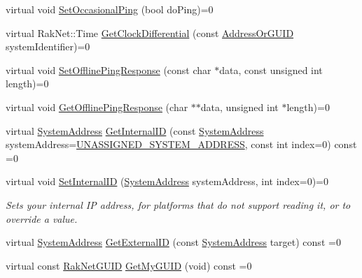 \begin{DoxyCompactItemize}
\item 
virtual void \hyperlink{class_rak_net_1_1_rak_peer_interface_afdc6e658512d2f01d6bb211758721f21}{Set\-Occasional\-Ping} (bool do\-Ping)=0
\item 
virtual Rak\-Net\-::\-Time \hyperlink{class_rak_net_1_1_rak_peer_interface_a7fa284803461a09efeffd65d73068c51}{Get\-Clock\-Differential} (const \hyperlink{struct_rak_net_1_1_address_or_g_u_i_d}{Address\-Or\-G\-U\-I\-D} system\-Identifier)=0
\item 
virtual void \hyperlink{class_rak_net_1_1_rak_peer_interface_a40b198325a1a4f4a1ff3b1a1741b89eb}{Set\-Offline\-Ping\-Response} (const char $\ast$data, const unsigned int length)=0
\item 
virtual void \hyperlink{class_rak_net_1_1_rak_peer_interface_ae61f8651e8a45acec5bdf04384777a86}{Get\-Offline\-Ping\-Response} (char $\ast$$\ast$data, unsigned int $\ast$length)=0
\item 
virtual \hyperlink{struct_rak_net_1_1_system_address}{System\-Address} \hyperlink{class_rak_net_1_1_rak_peer_interface_a928a49c193687ccef547f7ea3634bb54}{Get\-Internal\-I\-D} (const \hyperlink{struct_rak_net_1_1_system_address}{System\-Address} system\-Address=\hyperlink{namespace_rak_net_a80c95b4ed53f42911a6fa92b85e929cf}{U\-N\-A\-S\-S\-I\-G\-N\-E\-D\-\_\-\-S\-Y\-S\-T\-E\-M\-\_\-\-A\-D\-D\-R\-E\-S\-S}, const int index=0) const =0
\item 
virtual void \hyperlink{class_rak_net_1_1_rak_peer_interface_ac9f163bc4b8b89db10c3f251793e0aca}{Set\-Internal\-I\-D} (\hyperlink{struct_rak_net_1_1_system_address}{System\-Address} system\-Address, int index=0)=0
\begin{DoxyCompactList}\small\item\em Sets your internal I\-P address, for platforms that do not support reading it, or to override a value. \end{DoxyCompactList}\item 
virtual \hyperlink{struct_rak_net_1_1_system_address}{System\-Address} \hyperlink{class_rak_net_1_1_rak_peer_interface_a94602ad7356b4a99f862f9793327c325}{Get\-External\-I\-D} (const \hyperlink{struct_rak_net_1_1_system_address}{System\-Address} target) const =0
\item 
\hypertarget{class_rak_net_1_1_rak_peer_interface_ab89d6d78297265c282c22c029a285fa2}{virtual const \hyperlink{struct_rak_net_1_1_rak_net_g_u_i_d}{Rak\-Net\-G\-U\-I\-D} \hyperlink{class_rak_net_1_1_rak_peer_interface_ab89d6d78297265c282c22c029a285fa2}{Get\-My\-G\-U\-I\-D} (void) const =0}\label{class_rak_net_1_1_rak_peer_interface_ab89d6d78297265c282c22c029a285fa2}


\end{DoxyCompactItemize}
